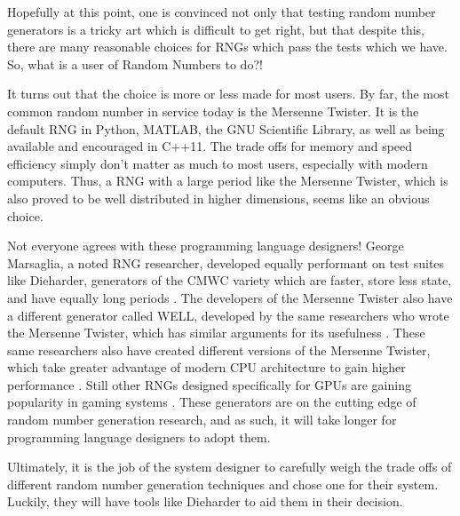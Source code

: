 Hopefully at this point, one is convinced not only that testing random number generators is a tricky art which is difficult to get right, but that despite this, there are many reasonable choices for RNGs which pass the tests which we have. So, what is a user of Random Numbers to do?!

It turns out that the choice is more or less made for most users. By far, the most common random number in service today is the Mersenne Twister. It is the default RNG in Python, MATLAB, the GNU Scientific Library, as well as being available and encouraged in C++11. The trade offs for memory and speed efficiency simply don't matter as much to most users, especially with modern computers. Thus, a RNG with a large period like the Mersenne Twister, which is also proved to be well distributed in higher dimensions, seems like an obvious choice.

Not everyone agrees with these programming language designers! George Marsaglia, a noted RNG researcher, developed equally performant on test suites like Dieharder, generators of the CMWC variety which are faster, store less state, and have equally long periods \cite{Marsaglia:2003:SRN:769800.769827}. The developers of the Mersenne Twister also have a different generator called WELL, developed by the same researchers who wrote the Mersenne Twister, which has similar arguments for its usefulness \cite{Panneton:2006:ILG:1132973.1132974}. These same researchers also have created different versions of the Mersenne Twister, which take greater advantage of modern CPU architecture to gain higher performance \cite{sfmt}. Still other RNGs designed specifically for GPUs are gaining popularity in gaming systems \cite{Passerat-Palmbach:2011:PNG:2060104.2060643,Zafar:2010:GRN:1921479.1921500}. These generators are on the cutting edge of random number generation research, and as such, it will take longer for programming language designers to adopt them.

Ultimately, it is the job of the system designer to carefully weigh the trade offs of different random number generation techniques and chose one for their system. Luckily, they will have tools like Dieharder to aid them in their decision.
